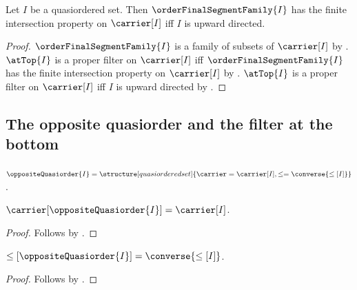 \begin{corollary}\label{final_segments_have_fip_iff_directed}
    Let $I$ be a quasiordered set.
    Then $\orderFinalSegmentFamily{I}$ has the finite intersection
        property on $\carrier[I]$ iff
        $I$ is upward directed.
\end{corollary}
\begin{proof}
    $\orderFinalSegmentFamily{I}$ is a family of subsets of
        $\carrier[I]$ by .
    $\atTop{I}$ is a proper filter on $\carrier[I]$ iff
        $\orderFinalSegmentFamily{I}$ has the finite intersection
            property on $\carrier[I]$ by
        .
    $\atTop{I}$ is a proper filter on $\carrier[I]$ iff
        $I$ is upward directed by
        .
\end{proof}

\subsection{The opposite quasiorder and the filter at the bottom}

\begin{definition}\label{opposite_quasiorder}
    $\oppositeQuasiorder{I}
        =\structure[quasiordered set]{
            \carrier=\carrier[I],
            \leq=\converse{\leq[I]}
        }$.
\end{definition}

\begin{proposition}\label{opposite_quasiorder_carrier}
    $\carrier[\oppositeQuasiorder{I}]=\carrier[I]$.
\end{proposition}
\begin{proof}
    Follows by
        .
\end{proof}

\begin{proposition}\label{opposite_quasiorder_relation}
    $\leq[\oppositeQuasiorder{I}]=\converse{\leq[I]}$.
\end{proposition}
\begin{proof}
    Follows by
        .
\end{proof}

